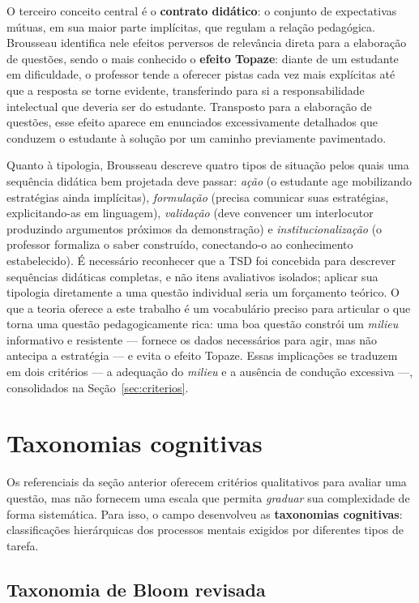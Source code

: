 O terceiro conceito central é o \textbf{contrato didático}: o conjunto de expectativas mútuas, em sua
maior parte implícitas, que regulam a relação pedagógica. Brousseau identifica nele efeitos perversos
de relevância direta para a elaboração de questões, sendo o mais conhecido o \textbf{efeito Topaze}:
diante de um estudante em dificuldade, o professor tende a oferecer pistas cada vez mais explícitas até
que a resposta se torne evidente, transferindo para si a responsabilidade intelectual que deveria ser
do estudante. Transposto para a elaboração de questões, esse efeito aparece em enunciados
excessivamente detalhados que conduzem o estudante à solução por um caminho previamente pavimentado.

Quanto à tipologia, Brousseau descreve quatro tipos de situação pelos quais uma sequência didática bem
projetada deve passar: \emph{ação} (o estudante age mobilizando estratégias ainda implícitas),
\emph{formulação} (precisa comunicar suas estratégias, explicitando-as em linguagem), \emph{validação}
(deve convencer um interlocutor produzindo argumentos próximos da demonstração) e
\emph{institucionalização} (o professor formaliza o saber construído, conectando-o ao conhecimento
estabelecido). É necessário reconhecer que a TSD foi concebida para descrever sequências didáticas
completas, e não itens avaliativos isolados; aplicar sua tipologia diretamente a uma questão individual
seria um forçamento teórico. O que a teoria oferece a este trabalho é um vocabulário preciso para
articular o que torna uma questão pedagogicamente rica: uma boa questão constrói um \emph{milieu}
informativo e resistente --- fornece os dados necessários para agir, mas não antecipa a estratégia ---
e evita o efeito Topaze. Essas implicações se traduzem em dois critérios --- a adequação do
\emph{milieu} e a ausência de condução excessiva ---, consolidados na Seção~\ref{sec:criterios}.

\section{Taxonomias cognitivas}
\label{sec:taxonomias}

Os referenciais da seção anterior oferecem critérios qualitativos para avaliar uma questão, mas não
fornecem uma escala que permita \emph{graduar} sua complexidade de forma sistemática. Para isso, o
campo desenvolveu as \textbf{taxonomias cognitivas}: classificações hierárquicas dos processos mentais
exigidos por diferentes tipos de tarefa.

\subsection{Taxonomia de Bloom revisada}
\label{sub:bloom}


